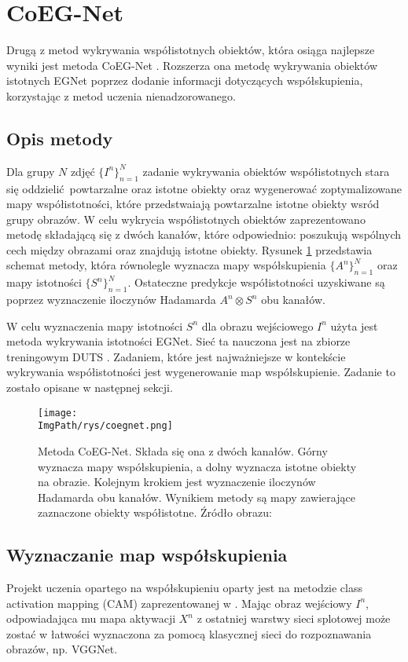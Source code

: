 \documentclass[a4paper,12pt,twoside,openany]{report}
\newcommand{\ImgPath}{.}
\begin{document}
\section{CoEG-Net}
Drugą z metod wykrywania współistotnych obiektów, która osiąga najlepsze wyniki jest metoda CoEG-Net \cite{fan2020rethinking}. Rozszerza ona metodę wykrywania obiektów istotnych EGNet \cite{zhao2019egnetedge} poprzez dodanie informacji dotyczących współskupienia, korzystając z metod uczenia nienadzorowanego.

\subsection{Opis metody}
Dla grupy $N$ zdjęć $\{I^n\}^N_{n=1}$ zadanie wykrywania obiektów współistotnych stara się oddzielić powtarzalne oraz istotne obiekty oraz wygenerować zoptymalizowane mapy współistotności, które przedstwaiają powtarzalne istotne obiekty wsród grupy obrazów. W celu wykrycia współistotnych obiektów zaprezentowano metodę składającą się z dwóch kanałów, które odpowiednio: poszukują wspólnych cech między obrazami oraz znajdują istotne obiekty. Rysunek \ref{coegnet} przedstawia schemat metody, która równolegle wyznacza mapy współskupienia $\{A^n\}^N_{n=1}$ oraz mapy istotności $\{S^n\}^N_{n=1}$. Ostateczne predykcje współistotności uzyskiwane są poprzez wyznaczenie iloczynów Hadamarda $A^n \otimes S^n$ obu kanałów.

W celu wyznaczenia mapy istotności $S^n$ dla obrazu wejściowego $I^n$ użyta jest metoda wykrywania istotności EGNet. Sieć ta nauczona jest na zbiorze treningowym DUTS \cite{duts}. Zadaniem, które jest najważniejsze w kontekście wykrywania współistotności jest wygenerowanie map współskupienie. Zadanie to zostało opisane w następnej sekcji.

\begin{figure}[h]
	\centering
	\texttt{[image: \\ImgPath/rys/coegnet.png]}
	\caption{Metoda CoEG-Net. Składa się ona z dwóch kanałów. Górny wyznacza mapy współskupienia, a dolny wyznacza istotne obiekty na obrazie. Kolejnym krokiem jest wyznaczenie iloczynów Hadamarda obu kanałów. Wynikiem metody są mapy zawierające zaznaczone obiekty współistotne. Źródło obrazu: \cite{fan2020rethinking}}
	\label{coegnet}
\end{figure}

\subsection{Wyznaczanie map współskupienia}
Projekt uczenia opartego na współskupieniu oparty jest na metodzie class
activation mapping (CAM) zaprezentowanej w \cite{cam}. Mając obraz wejściowy $I^n$, odpowiadająca mu mapa aktywacji $X^n$ z ostatniej warstwy sieci splotowej może zostać w łatwości wyznaczona za pomocą klasycznej sieci do rozpoznawania obrazów, np. VGGNet. 
\end{document}
